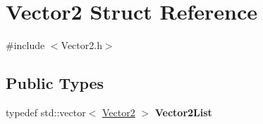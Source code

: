 \hypertarget{structVector2}{}\section{Vector2 Struct Reference}
\label{structVector2}


{\ttfamily \#include $<$Vector2.\+h$>$}

\subsection*{Public Types}
\begin{DoxyCompactItemize}
\item 
\hypertarget{structVector2_adab03c8453d61490400f44dc95b1ec3f}{}typedef std\+::vector$<$ \hyperlink{structVector2}{Vector2} $>$ {\bfseries Vector2\+List}\label{structVector2_adab03c8453d61490400f44dc95b1ec3f}

\end{DoxyCompactItemize}
